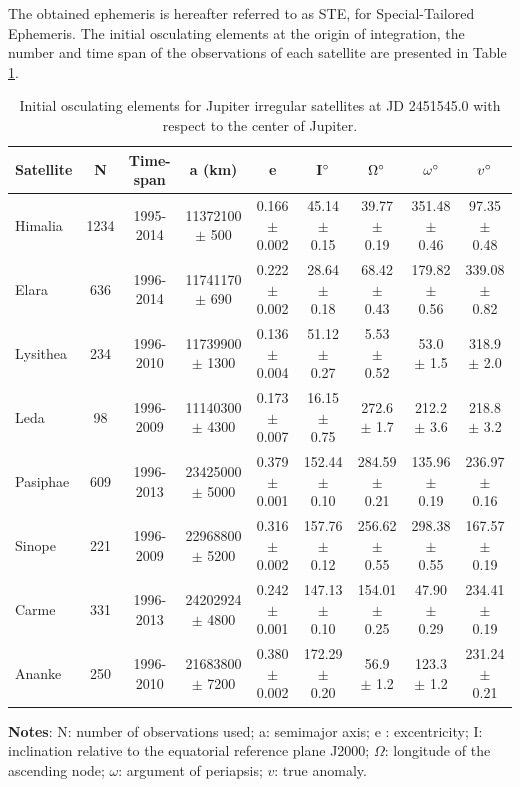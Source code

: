 \documentclass[useAMS,usenatbib]{mn2e}
\begin{document}
The obtained ephemeris is hereafter referred to as STE, for Special-Tailored Ephemeris. The initial osculating elements at the origin of integration, the number and time span of the observations of each satellite are presented in Table \ref{Tab: sat_ell}.

\begin{table}
\caption{Initial osculating elements for Jupiter irregular satellites at JD 2451545.0 with respect to the center of Jupiter.
 }\label{Tab: sat_ell}
\begin{center}
\begin{tabular}{lcccccccc}
\hline\hline
Satellite & N & Time-span & a (km) & e & I$\hbox{$^\circ$}$ & $\Omega\hbox{$^\circ$}$ & $\omega\hbox{$^\circ$}$ & $v\hbox{$^\circ$}$ \\ 
\hline
Himalia & 1234 & 1995-2014 &   11372100 $\pm$ 500    &    0.166 $\pm$ 0.002      &   45.14 $\pm$ 0.15      &   39.77 $\pm$ 0.19      &   351.48 $\pm$ 0.46      &   97.35 $\pm$ 0.48    \\
Elara & 636 & 1996-2014 &   11741170 $\pm$ 690  &      0.222 $\pm$ 0.002      &   28.64 $\pm$ 0.18      &   68.42 $\pm$ 0.43      &   179.82 $\pm$ 0.56      &   339.08 $\pm$ 0.82  \\
Lysithea & 234 & 1996-2010 &   11739900 $\pm$ 1300  &      0.136 $\pm$ 0.004      &    51.12 $\pm$ 0.27     &   5.53 $\pm$ 0.52      &   53.0 $\pm$ 1.5      &   318.9 $\pm$ 2.0   \\
Leda & 98 & 1996-2009 &   11140300  $\pm$ 4300  &     0.173  $\pm$ 0.007     &   16.15  $\pm$ 0.75    &   272.6  $\pm$ 1.7    &   212.2  $\pm$ 3.6          &   218.8  $\pm$ 3.2  \\
Pasiphae & 609 & 1996-2013 &  23425000  $\pm$ 5000    &     0.379  $\pm$ 0.001       &   152.44 $\pm$ 0.10      &   284.59 $\pm$ 0.21      &   135.96 $\pm$ 0.19      &   236.97 $\pm$ 0.16 \\
Sinope & 221 & 1996-2009 &   22968800 $\pm$ 5200   &     0.316 $\pm$ 0.002      &   157.76 $\pm$ 0.12      &   256.62 $\pm$ 0.55      &   298.38 $\pm$ 0.55      &   167.57 $\pm$ 0.19    \\
Carme & 331 & 1996-2013 &   24202924 $\pm$ 4800      &  0.242 $\pm$ 0.001      &   147.13 $\pm$ 0.10      &   154.01 $\pm$ 0.25      &   47.90 $\pm$ 0.29      &   234.41 $\pm$ 0.19  \\
Ananke & 250 & 1996-2010 &  21683800  $\pm$ 7200  &     0.380 $\pm$ 0.002      &   172.29 $\pm$ 0.20      &   56.9 $\pm$ 1.2      &   123.3 $\pm$ 1.2      &   231.24 $\pm$ 0.21  \\
\hline
\end{tabular} 
\end{center}
\begin{flushleft}
\textbf{Notes}: N: number of observations used; a: semimajor axis; e : excentricity; I: inclination relative to the equatorial reference plane J2000; $\Omega$: longitude of the ascending node; $\omega$: argument of periapsis; $v$: true anomaly.
\end{flushleft}
\end{table}
\end{document}
